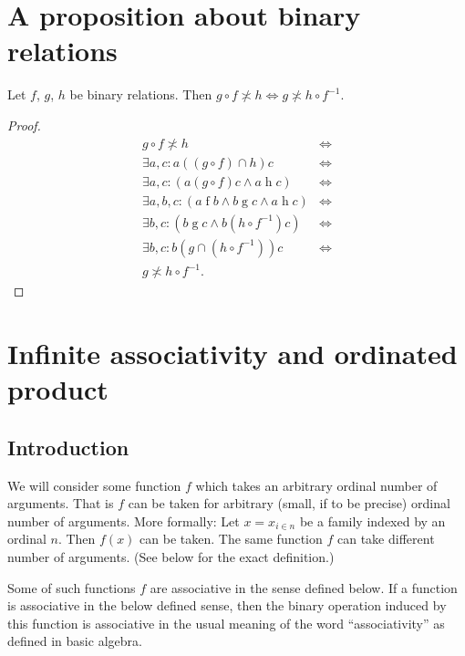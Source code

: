 \section{A proposition about binary relations}
\begin{prop}
\label{rel-cross}Let $f$, $g$, $h$ be binary relations. Then $g\circ f\nasymp h\Leftrightarrow g\nasymp h\circ f^{-1}$.\end{prop}
\begin{proof}
~
\begin{align*}
g\circ f\nasymp h & \Leftrightarrow\\
\exists a,c:a\mathrel{((g\circ f)\cap h)}c & \Leftrightarrow\\
\exists a,c:(a\mathrel{(g\circ f)}c\land a\mathrel{h}c) & \Leftrightarrow\\
\exists a,b,c:(a\mathrel{f}b\land b\mathrel{g}c\land a\mathrel{h}c) & \Leftrightarrow\\
\exists b,c:(b\mathrel{g}c\land b\mathrel{(h\circ f^{-1})}c) & \Leftrightarrow\\
\exists b,c:b\mathrel{(g\cap(h\circ f^{-1}))}c & \Leftrightarrow\\
g\nasymp h\circ f^{-1}.
\end{align*}

\end{proof}

\section{Infinite associativity and ordinated product}


\subsection{Introduction}

We will consider some function $f$ which takes an arbitrary ordinal
number of arguments. That is $f$ can be taken for arbitrary (small,
if to be precise) ordinal number of arguments. More formally: Let
$x=x_{i\in n}$ be a family indexed by an ordinal $n$. Then $f(x)$
can be taken. The same function $f$ can take different number of
arguments. (See below for the exact definition.)

Some of such functions $f$ are associative in the sense defined below.
If a function is associative in the below defined sense, then the
binary operation induced by this function is associative in the usual
meaning of the word ``associativity'' as defined in basic algebra.

